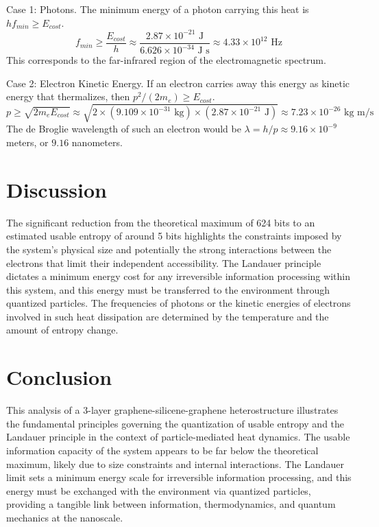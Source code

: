 		Case 1: Photons. The minimum energy of a photon carrying this heat is $h f_{min} \ge E_{cost}$.
		$$ f_{min} \ge \frac{E_{cost}}{h} \approx \frac{2.87 \times 10^{-21} \text{ J}}{6.626 \times 10^{-34} \text{ J s}} \approx 4.33 \times 10^{12} \text{ Hz} $$
		This corresponds to the far-infrared region of the electromagnetic spectrum.
		
		Case 2: Electron Kinetic Energy. If an electron carries away this energy as kinetic energy that thermalizes, then $p^2 / (2m_e) \ge E_{cost}$.
		$$ p \ge \sqrt{2 m_e E_{cost}} \approx \sqrt{2 \times (9.109 \times 10^{-31} \text{ kg}) \times (2.87 \times 10^{-21} \text{ J})} \approx 7.23 \times 10^{-26} \text{ kg m/s} $$
		The de Broglie wavelength of such an electron would be $\lambda = h / p \approx 9.16 \times 10^{-9}$ meters, or $9.16$ nanometers.
		
		\section{Discussion}
		The significant reduction from the theoretical maximum of 624 bits to an estimated usable entropy of around 5 bits highlights the constraints imposed by the system's physical size and potentially the strong interactions between the electrons that limit their independent accessibility. The Landauer principle dictates a minimum energy cost for any irreversible information processing within this system, and this energy must be transferred to the environment through quantized particles. The frequencies of photons or the kinetic energies of electrons involved in such heat dissipation are determined by the temperature and the amount of entropy change.
		
		\section{Conclusion}
		This analysis of a 3-layer graphene-silicene-graphene heterostructure illustrates the fundamental principles governing the quantization of usable entropy and the Landauer principle in the context of particle-mediated heat dynamics. The usable information capacity of the system appears to be far below the theoretical maximum, likely due to size constraints and internal interactions. The Landauer limit sets a minimum energy scale for irreversible information processing, and this energy must be exchanged with the environment via quantized particles, providing a tangible link between information, thermodynamics, and quantum mechanics at the nanoscale.
		
